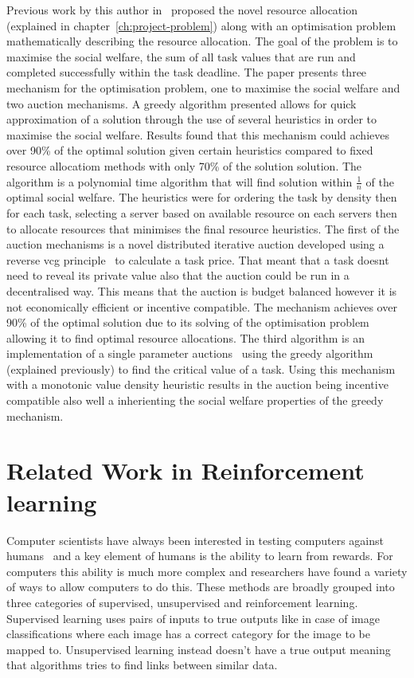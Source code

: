 Previous work by this author in~\cite{FlexibleResourceAllocation} proposed the novel resource allocation (explained in
chapter~\ref{ch:project-problem}) along with an optimisation problem mathematically describing the resource allocation.
The goal of the problem is to maximise the social welfare, the sum of all task values that are run and completed
successfully within the task deadline.
The paper presents three mechanism for the optimisation problem, one to maximise the social welfare and two auction
mechanisms. A greedy algorithm presented allows for quick approximation of a solution through the use of several
heuristics in order to maximise the social welfare. Results found that this mechanism could achieves over 90\% of the
optimal solution given certain heuristics compared to fixed resource allocatiom methods with only 70\% of
the solution solution. The algorithm is a polynomial time algorithm that will find solution within $\frac{1}{n}$
of the optimal social welfare. The heuristics were for ordering the task by density then for each task,
selecting a server based on available resource on each servers then to allocate resources that minimises the final
resource heuristics. The first of the auction mechanisms is a novel distributed iterative auction developed using
a reverse vcg principle~\citep{vickrey, Clarke, groves} to calculate a task price. That meant that a task doesnt need
to reveal its private value also that the auction could be run in a decentralised way. This means that the auction is
budget balanced however it is not economically efficient or incentive compatible. The mechanism achieves over 90\% of
the optimal solution due to its solving of the optimisation problem allowing it to find optimal resource allocations.
The third algorithm is an implementation of a single parameter auctions~\citep{nisan2007algorithmic_critical_value}
using the greedy algorithm (explained previously) to find the critical value of a task. Using this mechanism with
a monotonic value density heuristic results in the auction being incentive compatible also well a inherienting the
social welfare properties of the greedy mechanism.

\section{Related Work in Reinforcement learning}\label{sec:related-work-in-machine-learning}
Computer scientists have always been interested in testing computers against humans~\citep{turing_test} and a key
element of humans is the ability to learn from rewards. For computers this ability is much more complex and
researchers have found a variety of ways to allow computers to do this. These methods are broadly grouped into three
categories of supervised, unsupervised and reinforcement learning. Supervised learning uses pairs of inputs to true
outputs like in case of image classifications where each image has a correct category for the image to be mapped to.
Unsupervised learning instead doesn't have a true output meaning that algorithms tries to find links between similar data.

